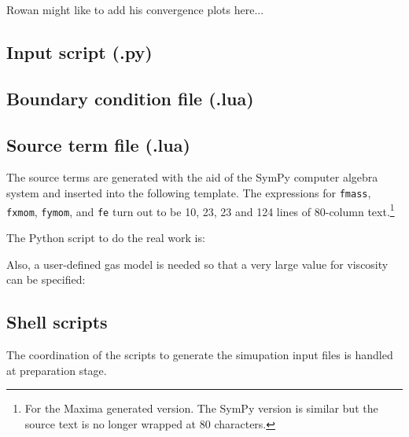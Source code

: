\bigskip\noindent
Rowan might like to add his convergence plots here...

\newpage
\subsection{Input script (.py)}
\topbar

\bottombar

\newpage
\subsection{Boundary condition file (.lua)}
\topbar

\bottombar

\newpage
\subsection{Source term file (.lua)}
%
The source terms are generated with the aid of the SymPy computer algebra system
and inserted into the following template.
The expressions for \texttt{fmass}, \texttt{fxmom}, \texttt{fymom}, and \texttt{fe}
turn out to be 10, 23, 23 and 124 lines of 80-column text.\footnote{For the Maxima generated version.  
The SymPy version is similar but the source text is no longer wrapped at 80 characters.}\\
\topbar

\bottombar

\bigskip
\noindent
The Python script to do the real work is:\\
\topbar

\bottombar

%

\newpage
\noindent
Also, a user-defined gas model is needed so that a very large value for viscosity can be specified:\\
\topbar

\bottombar

\newpage
\subsection{Shell scripts}
\label{mms-viscous-sh-files}
The coordination of the scripts to generate the simupation input files is handled at 
preparation stage.\\
\topbar

\bottombar

